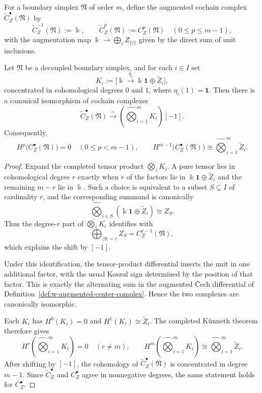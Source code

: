 \begin{definition}
\label{def:w-augmented-center-complex}
For a boundary simplex $\mathfrak N$ of order $m$, define the augmented cochain complex
$\widetilde C_Z^\bullet(\mathfrak N)$ by
\[
\widetilde C_Z^{-1}(\mathfrak N):=\Bbbk,
\qquad
\widetilde C_Z^p(\mathfrak N):=C_Z^p(\mathfrak N)\quad (0\le p\le m-1),
\]
with the augmentation map $\Bbbk\to \bigoplus_i Z_{\{i\}}$ given by the direct sum of unit inclusions.
\end{definition}

\begin{theorem}
\label{thm:w-augmented-center-tensor-model}
Let $\mathfrak N$ be a decoupled boundary simplex, and for each $i\in I$ set
\[
K_i:=\bigl[\Bbbk\xrightarrow{\eta_i} \Bbbk\mathbf{1}\oplus \widetilde Z_i\bigr],
\]
concentrated in cohomological degrees $0$ and $1$, where $\eta_i(1)=\mathbf{1}$.
Then there is a canonical isomorphism of cochain complexes
\[
\widetilde C_Z^\bullet(\mathfrak N)
\xrightarrow{\sim}
\left(\widehat\bigotimes_{i=1}^m K_i\right)[-1].
\]
Consequently,
\[
H^p\bigl(C_Z^\bullet(\mathfrak N)\bigr)=0
\quad (0\le p<m-1),
\qquad
H^{m-1}\bigl(C_Z^\bullet(\mathfrak N)\bigr)
\cong
\widehat\bigotimes_{i=1}^m \widetilde Z_i.
\]
\end{theorem}

\begin{proof}
Expand the completed tensor product $\widehat\bigotimes_i K_i$. A pure tensor lies in cohomological
degree $r$ exactly when $r$ of the factors lie in $\Bbbk\mathbf{1}\oplus \widetilde Z_i$ and the remaining
$m-r$ lie in $\Bbbk$. Such a choice is equivalent to a subset $S\subseteq I$ of cardinality $r$, and the
corresponding summand is canonically
\[
\widehat\bigotimes_{i\in S}(\Bbbk\mathbf{1}\oplus \widetilde Z_i)
\cong Z_S.
\]
Thus the degree-$r$ part of $\widehat\bigotimes_i K_i$ identifies with
\[
\bigoplus_{|S|=r} Z_S = C_Z^{r-1}(\mathfrak N),
\]
which explains the shift by $[-1]$.

Under this identification, the tensor-product differential inserts the unit in one additional factor, with
the usual Koszul sign determined by the position of that factor. This is exactly the alternating sum in the
augmented \v{C}ech differential of Definition~\ref{def:w-augmented-center-complex}. Hence the two complexes
are canonically isomorphic.

Each $K_i$ has $H^0(K_i)=0$ and $H^1(K_i)\cong \widetilde Z_i$. The completed K\"unneth theorem therefore gives
\[
H^r\left(\widehat\bigotimes_{i=1}^m K_i\right)=0\quad (r\neq m),
\qquad
H^m\left(\widehat\bigotimes_{i=1}^m K_i\right)
\cong
\widehat\bigotimes_{i=1}^m \widetilde Z_i.
\]
After shifting by $[-1]$, the cohomology of $\widetilde C_Z^\bullet(\mathfrak N)$ is concentrated in degree $m-1$.
Since $\widetilde C_Z^\bullet$ and $C_Z^\bullet$ agree in nonnegative degrees, the same statement holds for
$C_Z^\bullet$.
\end{proof}

